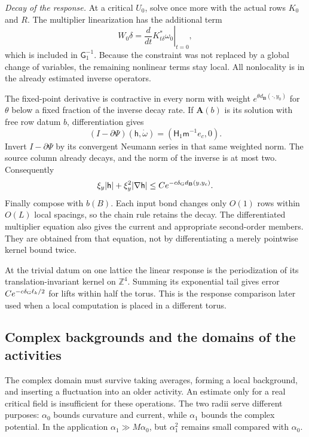\documentclass[11pt,letterpaper,reqno]{amsart}
\theoremstyle{definition}
\theoremstyle{remark}
\begin{document}
\emph{Decay of the response.}
At a critical $U_0$, solve once more
with the actual rows $K_0$ and $R$.
The multiplier linearization has the
additional term
\[
 W_0\delta=
      \left.\frac d{dt}K_{t\delta}^*\omega_0\right|_{t=0},
\]
which is included in $\mathsf G_1^{-1}$.
Because the constraint was not replaced
by a global change of variables, the
remaining nonlinear terms stay local.
All nonlocality is in the already
estimated inverse operators.

The fixed-point derivative is contractive
in every norm with weight
$e^{\theta d_{\mathbf B}(\cdot,y_0)}$
for $\theta$ below a fixed fraction
of the inverse decay rate. If
$\mathbf A(b)$ is its solution with
free row datum $b$, differentiation gives
\[
 (I-\partial\Psi)(\mathsf h,\dot\omega)
                                      =(\mathsf H_1\mathsf m^{-1}e_c,0).
\]
Invert $I-\partial\Psi$ by its
convergent Neumann series in that
same weighted norm. The source
column already decays, and the norm
of the inverse is at most two.
Consequently
\[
 \xi_y|\mathsf h|+\xi_y^2|\nabla\mathsf h|
       \le Ce^{-c\delta_{\rm G}d_{\mathbf B}(y,y_c)}.
\]
Finally compose with $b(B)$.
Each input bond changes only $O(1)$
rows within $O(L)$ local spacings,
so the chain rule retains the decay.
The differentiated multiplier equation
also gives the current and appropriate
second-order members. They are obtained
from that equation, not by
differentiating a merely pointwise
kernel bound twice.

At the trivial datum on one lattice
the linear response is the periodization
of its translation-invariant kernel on
$\mathbb Z^4$. Summing its exponential
tail gives error
$Ce^{-c\delta_{\rm G}\ell_k/2}$ for
lifts within half the torus. This is
the response comparison later used
when a local computation is placed
in a different torus.

\subsection{Complex backgrounds and the domains of the activities}

The complex domain must survive taking averages, forming a local
background, and inserting a fluctuation into an older activity.
An estimate only for a real critical field is insufficient for
these operations. The two radii serve different purposes:
$\alpha_0$ bounds curvature and current, while $\alpha_1$
bounds the complex potential. In the application
$\alpha_1\gg M\alpha_0$, but $\alpha_1^2$ remains small
compared with $\alpha_0$.
\end{document}
